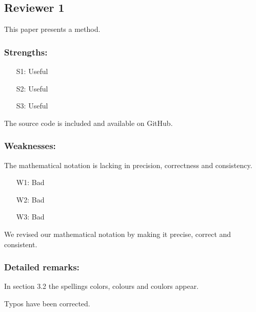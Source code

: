 \subsection{Reviewer 1} \label{sec:rev:1}

This paper presents a method.

\subsubsection*{Strengths:}

\begin{itemize}[itemsep=1pt,parsep=1pt]
    \item[S1:] Useful
    \item[S2:] Useful
    \item[S3:] Useful
\end{itemize}

\noindent The source code is included and available on GitHub.


\subsubsection*{Weaknesses:}

The mathematical notation is lacking in precision, correctness and consistency.

\begin{itemize}[itemsep=1pt,parsep=1pt]
    \item[W1:] Bad
    \item[W2:] Bad
    \item[W3:] Bad
\end{itemize}

\begin{response} \label{res:rev1:weak:math}
We revised our mathematical notation by making it precise, correct and consistent.
\end{response}


\subsubsection*{Detailed remarks:}

In section 3.2 the spellings colors, colours and coulors appear.

\begin{response} \label{res:rev1:detail:types}
Typos have been corrected.
\end{response}


